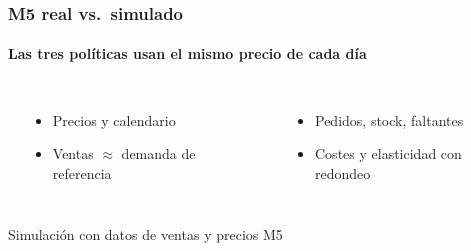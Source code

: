 \documentclass[aspectratio=169,10pt]{beamer}
\begin{document}
\begin{frame}
\frametitle{M5 real vs.\ simulado}
\framesubtitle{Las tres pol\'iticas usan el mismo precio de cada d\'ia}
\begin{columns}[T,onlytextwidth]
\begin{center}\end{center}
\vspace{0.1cm}
\begin{itemize}
  \item Precios y calendario
  \item Ventas $\approx$ demanda de referencia
\end{itemize}
\begin{center}\end{center}
\vspace{0.1cm}
\begin{itemize}
  \item Pedidos, stock, faltantes
  \item Costes y elasticidad con redondeo
\end{itemize}
\end{columns}
\vspace{0.35cm}
\begin{center}
{\scriptsize\color{p2teal} Simulaci\'on con datos de ventas y precios M5\par}
\end{center}
\end{frame}
\end{document}
